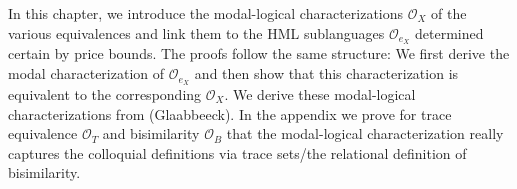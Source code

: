 %
\begin{isabellebody}%
%
%
\isadelimtheory
%
\endisadelimtheory
%
\isatagtheory
%
\endisatagtheory
{\isafoldtheory}%
%
\isadelimtheory
%
\endisadelimtheory
%
\isadelimdocument
%
\endisadelimdocument
%
\isatagdocument
%
\isamarkuptrue%
%
\endisatagdocument
{\isafolddocument}%
%
\isadelimdocument
%
\endisadelimdocument
%
\begin{isamarkuptext}%
In this chapter, we introduce the modal-logical characterizations $\mathcal{O}_X$ of the various equivalences and link them to the HML sublanguages $\mathcal{O}_{e_X}$ determined 
certain by price bounds. The proofs follow the same structure: We first derive the modal characterization of $\mathcal{O}_{e_X}$ and then show that this characterization is equivalent to the corresponding $\mathcal{O}_X$.
We derive these modal-logical characterizations from (Glaabbeeck). In the appendix we prove for trace equivalence $\mathcal{O}_T$ and bisimilarity $\mathcal{O}_B$ that the modal-logical characterization really captures
the colloquial definitions via trace sets/the relational definition of bisimilarity.%
\end{isamarkuptext}\isamarkuptrue%
%
\isadelimtheory
%
\endisadelimtheory
%
\isatagtheory
%
\endisatagtheory
{\isafoldtheory}%
%
\isadelimtheory
%
\endisadelimtheory
%
\end{isabellebody}%
\endinput
